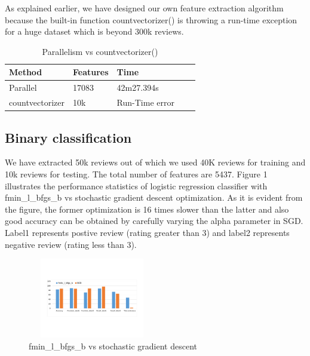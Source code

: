 \documentclass{article}
\begin{document}
As explained earlier, we have designed our own feature extraction algorithm because the built-in function countvectorizer() is throwing a run-time exception for a huge dataset which is beyond 300k reviews.


\begin{table}[H]
\caption{Parallelism vs countvectorizer()}
\label{sample-table}
\begin{center}
\begin{small}
\begin{sc}
\begin{tabular}{lllll}
\hline
Method & Features & Time \\
\hline
Parallel  & 17083 & 42m27.394s \\
countvectorizer  & 10k & Run-Time error \\
\hline
\end{tabular}
\end{sc}
\end{small}
\end{center}
\end{table}


\subsection{Binary classification}

We have extracted 50k reviews out of which we used 40K reviews for training and 10k reviews for testing. The total number of features are 5437. 
Figure 1 illustrates the performance statistics of logistic regression classifier with fmin\_l\_bfgs\_b vs stochastic gradient descent optimization. As it is evident from the figure, the former optimization is 16 times slower than the latter and also good accuracy can be obtained by carefully varying the alpha parameter in SGD. Label1 represents postive review (rating greater than 3) and label2 represents negative review (rating less than 3).

\begin{figure}[H]
  \caption{fmin\_l\_bfgs\_b vs stochastic gradient descent}
  \centering
    \includegraphics[width=0.5\textwidth,height=3.5cm]{newtemp}
\end{figure}
\end{document}
